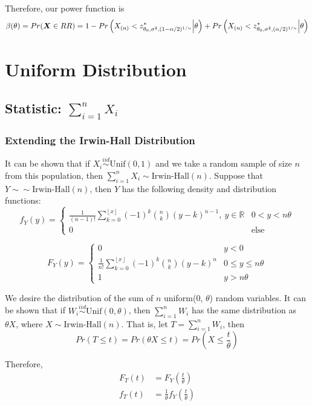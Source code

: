 \documentclass[]{article}
\newcommand{\bfX}{\mbox{\boldmath $X$}}
\providecommand{\floor}[1]{\left \lfloor #1 \right \rfloor }
\begin{document}
Therefore, our power function is
\[
\beta(\theta) = Pr(\bfX \in RR) = 1 - Pr\left(X_{(n)} < z^*_{\theta_0, \sigma^2, (1 - \alpha/2)^{1/n}} \Big| \theta\right) + Pr\left(X_{(n)} < z^*_{\theta_0, \sigma^2, (\alpha/2)^{1/n}} \Big| \theta\right)
\]

\section{Uniform Distribution}

\subsection{Statistic: $\sum_{i=1}^n X_i$}

\subsubsection{Extending the Irwin-Hall Distribution}

It can be shown that if $X_i \stackrel{iid}{\sim} \text{Unif}(0, 1)$ and we take a random sample of size $n$ from this population, then $\sum_{i=1}^n X_i \sim \text{Irwin-Hall}(n)$. Suppose that $Y \sim \sim \text{Irwin-Hall}(n)$, then $Y$ has the following density and distribution functions:
\[
f_Y(y) =\begin{cases}
\frac{1}{(n-1)!} \sum_{k = 0}^{\floor{x}} (-1)^k \binom{n}{k}(y-k)^{n-1}, \ y \in \mathbb{R} & 0 < y < n\theta \\
0 & \text{else}
\end{cases} 
\]

\[
F_Y(y) = \begin{cases}
0 & y < 0 \\
\frac{1}{n!} \sum_{k = 0}^{\floor{x}} (-1)^k \binom{n}{k}(y-k)^{n} & 0 \leq y \leq n\theta \\
1 & y > n\theta 
\end{cases}
\]

We desire the distribution of the sum of $n$ uniform(0, $\theta$) random variables. It can be shown that if $W_i \stackrel{iid}{\sim} \text{Unif}(0, \theta)$, then $\sum_{i=1}^n W_i$ has the same distribution as $\theta X$, where $X \sim \text{Irwin-Hall}(n)$. That is, let $T = \sum_{i=1}^n W_i$, then
\[
Pr(T \leq t) = Pr(\theta X \leq t) = Pr\left(X \leq \frac{t}{\theta}\right)
\]

Therefore, 
\[
\begin{split}
F_T(t) &= F_Y\left(\frac{t}{\theta} \right) \\
f_T(t) &= \frac{1}{\theta} f_Y\left(\frac{t}{\theta}\right)
\end{split}
\]
\end{document}
